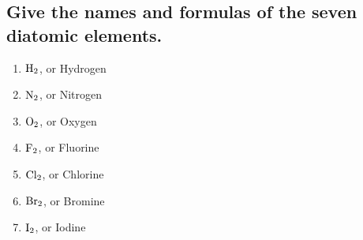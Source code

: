 \documentclass[11pt]{article}
\begin{document}
\subsection{Give the names and formulas of the seven diatomic elements.}
\label{sec:orgab02a76}
\begin{enumerate}
\item \(\ce{H2}\), or Hydrogen
\item \(\ce{N2}\), or Nitrogen
\item \(\ce{O2}\), or Oxygen
\item \(\ce{F2}\), or Fluorine
\item \(\ce{Cl2}\), or Chlorine
\item \(\ce{Br2}\), or Bromine
\item \(\ce{I2}\), or Iodine
\end{enumerate}
\end{document}
